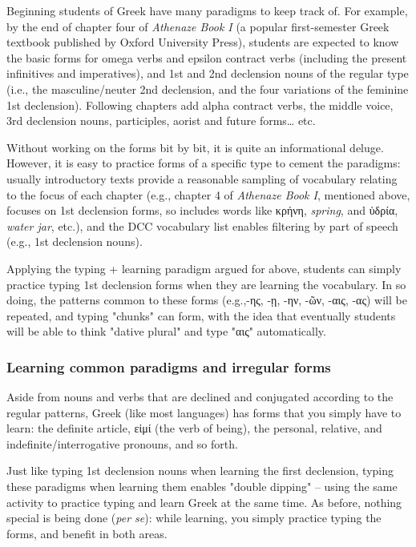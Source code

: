 \documentclass[11pt]{article}
\begin{document}
Beginning students of Greek have many paradigms to keep track of. For example, by the end of chapter four of \emph{Athenaze Book I} (a popular first-semester Greek textbook published by Oxford University Press), students are expected to know the basic forms for omega verbs and epsilon contract verbs (including the present infinitives and imperatives), and 1st and 2nd declension nouns of the regular type (i.e., the masculine/neuter 2nd declension, and the four variations of the feminine 1st declension). Following chapters add alpha contract verbs, the middle voice, 3rd declension nouns, participles, aorist and future forms\ldots{} etc.

Without working on the forms bit by bit, it is quite an informational deluge. However, it is easy to practice forms of a specific type to cement the paradigms: usually introductory texts provide a reasonable sampling of vocabulary relating to the focus of each chapter (e.g., chapter 4 of \emph{Athenaze Book I}, mentioned above, focuses on 1st declension forms, so includes words like κρήνη, \emph{spring}, and ὑδρία, \emph{water jar}, etc.), and the DCC vocabulary list enables filtering by part of speech (e.g., 1st declension nouns).

Applying the typing + learning paradigm argued for above, students can simply practice typing 1st declension forms when they are learning the vocabulary. In so doing, the patterns common to these forms (e.g.,-ης, -ῃ, -ην, -ῶν, -αις, -ας) will be repeated, and typing "chunks" can form, with the idea that eventually students will be able to think "dative plural" and type "αις" automatically.

\subsubsection{Learning common paradigms and irregular forms}
\label{sec:orgc91bf95}

Aside from nouns and verbs that are declined and conjugated according to the regular patterns, Greek (like most languages) has forms that you simply have to learn: the definite article, εἰμί (the verb of being), the personal, relative, and indefinite/interrogative pronouns, and so forth.

Just like typing 1st declension nouns when learning the first declension, typing these paradigms when learning them enables "double dipping" -- using the same activity to practice typing and learn Greek at the same time. As before, nothing special is being done (\emph{per se}): while learning, you simply practice typing the forms, and benefit in both areas.
\end{document}
